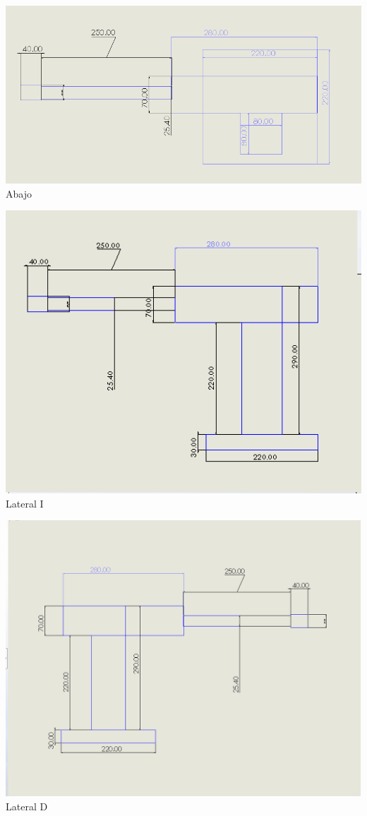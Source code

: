 \documentclass[12pt,a4paper]{report}
\begin{document}
\begin{center}
\includegraphics[scale=.6]{DibujoCAD3.png}
Abajo
\end{center}


\begin{center}
\includegraphics[scale=.6]{DibujoCAD2.png}
Lateral I
\end{center}

\begin{center}
\includegraphics[scale=.3]{DibujoCAD.png}
Lateral D
\end{center}
\end{document}
